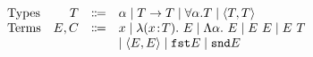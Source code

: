 \[
\begin{array}{lrrl}
  \text{Types} & T & \Coloneqq &
    \alpha
    \mid T \to T
    \mid \forall \alpha. T
    \mid \langle T, T \rangle \\

  \text{Terms} & E, C & \Coloneqq &
    x
    \mid \lambda (x \!:\! T).~ E
    \mid \Lambda \alpha.~ E
    \mid {E} ~ {E}
    \mid {E} ~ {T} \\ & & &
    \mid \langle E, E \rangle
    \mid \texttt{fst} E
    \mid \texttt{snd} E
\end{array}
\]
